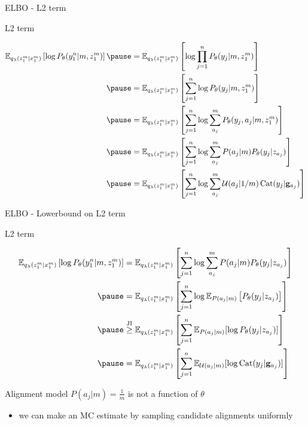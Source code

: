 \begin{frame}[plain]{ELBO - L2 term}

L2 term
\begin{small}
\begin{equation*}
\begin{aligned}
\mathbb E_{q_\lambda(z_1^m|x_1^m)}\left[ \log P_\theta(y_1^n|m, z_1^m)\right] 
\pause &= \mathbb E_{q_\lambda(z_1^m|x_1^m)}\left[ \log \prod_{j=1}^n P_\theta(y_j|m, z_1^m)\right]  \\ \pause
&= \mathbb E_{q_\lambda(z_1^m|x_1^m)}\left[  \sum_{j=1}^n \log P_\theta(y_j|m, z_1^m)\right]   \\ \pause
&= \mathbb E_{q_\lambda(z_1^m|x_1^m)}\left[  \sum_{j=1}^n \log \sum_{a_j}^m P_\theta(y_j, a_j|m, z_1^m)\right]   \\ \pause
&= \mathbb E_{q_\lambda(z_1^m|x_1^m)}\left[  \sum_{j=1}^n \log \sum_{a_j}^m P(a_j|m) P_\theta(y_j|z_{a_j}) \right]  \\  \pause
&= \mathbb E_{q_\lambda(z_1^m|x_1^m)}\left[  \sum_{j=1}^n \log \sum_{a_j}^m \mathcal U(a_j|1/m) \Cat(y_j|\mathbf g_{a_j})\right]
\end{aligned}
\end{equation*}
\end{small}


\end{frame}

\begin{frame}[plain]{ELBO - Lowerbound on L2 term}

L2 term
\begin{small}
\begin{equation*}
\begin{aligned}
\mathbb E_{q_\lambda(z_1^m|x_1^m)}\left[ \log P_\theta(y_1^n|m, z_1^m)\right] 
 &= \mathbb E_{q_\lambda(z_1^m|x_1^m)}\left[  \sum_{j=1}^n \log \sum_{a_j}^m P(a_j|m) P_\theta(y_j|z_{a_j}) \right]  \\  \pause
 &= \mathbb E_{q_\lambda(z_1^m|x_1^m)}\left[  \sum_{j=1}^n \log \mathbb E_{P(a_j|m)} \left[ P_\theta(y_j|z_{a_j}) \right] \right]  \\  \pause
&\overset{\text{JI}}{\ge} \mathbb E_{q_\lambda(z_1^m|x_1^m)}\left[  \sum_{j=1}^n \mathbb E_{P(a_j|m)} [\log P_\theta(y_j|z_{a_j}) ]\right]  \\  \pause
&= \mathbb E_{q_\lambda(z_1^m|x_1^m)}\left[  \sum_{j=1}^n \mathbb E_{\mathcal U(a_j|m)} [\log \Cat(y_j|\mathbf g_{a_j}) ]\right] 
\end{aligned}
\end{equation*}
\end{small}

\pause

Alignment model $P(a_j|m)=\frac{1}{m}$ is not a function of $\theta$
\begin{itemize}
	\item we can make an MC estimate by sampling candidate alignments uniformly
\end{itemize}


\end{frame}

